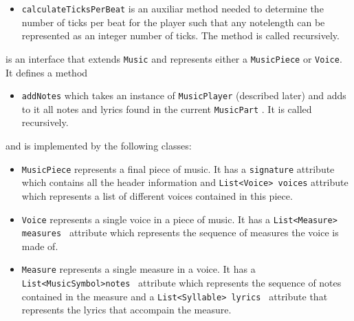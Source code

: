 \documentclass[12pt]{book}
\begin{document}
\begin{itemize} 

\item { \tt calculateTicksPerBeat} is an auxiliar method needed to determine the number of ticks per beat for the player such that any notelength can be represented as an integer number of ticks. The method is called recursively.
\end{itemize}

\medskip 

 is an interface that extends {\tt Music} and represents either a {\tt MusicPiece} or {\tt Voice}.  It defines a method
\begin{itemize} 
\item { \tt addNotes} which takes an instance of  {\tt MusicPlayer} (described later) and adds to it all notes and lyrics found in the current {\tt MusicPart}  . It is called recursively.
\end{itemize}

\noindent and is implemented by the following classes:
\begin{itemize} 
\item { \tt MusicPiece} represents a final piece of music.   It has a {\tt signature} attribute which contains all the header information and {\tt List<Voice> voices} attribute which represents a list of different voices contained in this piece.
\item {\tt Voice}  represents a single voice in a piece of music. It has a {\tt List<Measure> measures } attribute which represents the sequence of measures the voice is made of.
\item {\tt Measure}  represents a single measure in a voice. It has a {\tt List<MusicSymbol>notes } attribute which represents the sequence of notes contained in the measure and a  {\tt List<Syllable> lyrics } attribute that represents the lyrics that accompain the measure.
\end{itemize}

\bigskip
\end{document}
